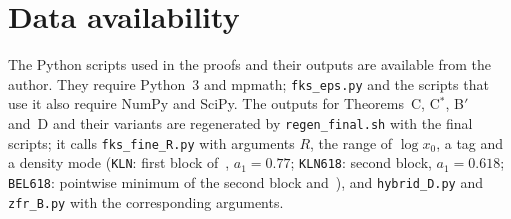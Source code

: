 \documentclass{amsart}
\theoremstyle{definition}
\theoremstyle{remark}
\theoremstyle{plain}
\numberwithin{equation}{section}
\newcommand{\Cstar}{C$^*$}
\newcommand{\Bp}{B$'$}
\begin{document}
\section*{Data availability}
The Python scripts used in the proofs and their outputs are available from the author. They require Python~3 and mpmath; \texttt{fks\_\allowbreak{}eps.py} and the scripts that use it also require NumPy and SciPy. The outputs for Theorems~C, \Cstar, \Bp{} and~D and their variants are regenerated by \texttt{regen\_\allowbreak{}final.sh} with the final scripts; it calls \texttt{fks\_\allowbreak{}fine\_\allowbreak{}R.py} with arguments $R$, the range of $\log x_0$, a tag and a density mode (\texttt{KLN}: first block of~\cite[Table~7]{FKS23}, $a_1=0.77$; \texttt{KLN618}: second block, $a_1=0.618$; \texttt{BEL618}: pointwise minimum of the second block and~\cite{Bel24}), and \texttt{hybrid\_\allowbreak{}D.py} and \texttt{zfr\_\allowbreak{}B.py} with the corresponding arguments.
\end{document}
